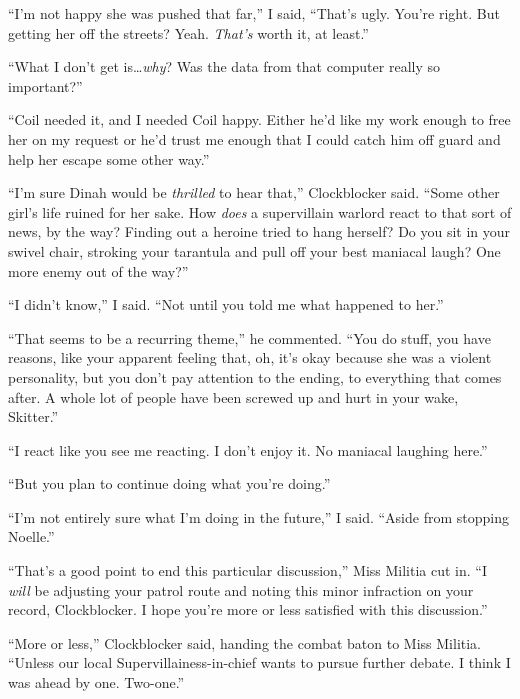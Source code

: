 ``I'm not happy she was pushed that far,'' I said, ``That's ugly.  You're right.  But getting her off the streets?  Yeah.  \emph{That's} worth it, at least.''



``What I don't get is\ldots \emph{why}?  Was the data from that computer really so important?''



``Coil needed it, and I needed Coil happy.  Either he'd like my work enough to free her on my request or he'd trust me enough that I could catch him off guard and help her escape some other way.''



``I'm sure Dinah would be \emph{thrilled} to hear that,'' Clockblocker said.  ``Some other girl's life ruined for her sake.  How \emph{does} a supervillain warlord react to that sort of news, by the way?  Finding out a heroine tried to hang herself?  Do you sit in your swivel chair, stroking your tarantula and pull off your best maniacal laugh?  One more enemy out of the way?''



``I didn't know,'' I said.  ``Not until you told me what happened to her.''



``That seems to be a recurring theme,'' he commented.  ``You do stuff, you have reasons, like your apparent feeling that, oh, it's okay because she was a violent personality, but you don't pay attention to the ending, to everything that comes after.  A whole lot of people have been screwed up and hurt in your wake, Skitter.''



``I react like you see me reacting.  I don't enjoy it.  No maniacal laughing here.''



``But you plan to continue doing what you're doing.''



``I'm not entirely sure what I'm doing in the future,'' I said.  ``Aside from stopping Noelle.''



``That's a good point to end this particular discussion,'' Miss Militia cut in.  ``I \emph{will} be adjusting your patrol route and noting this minor infraction on your record, Clockblocker.  I hope you're more or less satisfied with this discussion.''



``More or less,'' Clockblocker said, handing the combat baton to Miss Militia.  ``Unless our local Supervillainess-in-chief wants to pursue further debate.  I think I was ahead by one.  Two-one.''



